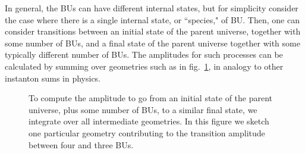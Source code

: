 \documentclass[11pt]{article}
\numberwithin{equation}{section}
\begin{document}
In general, the BUs can have different internal states, but for simplicity consider the case where there is a single internal state, or 
 ``species," of BU.  Then, one can consider transitions between an initial state of the parent universe, together with some number of BUs, and a final state of the parent universe together with some typically different number of BUs.  The amplitudes for such processes can be calculated by summing over geometries such as in fig.~\ref{fig:whamp}, in analogy to other instanton sums in physics.
\begin{figure}[h!]
\begin{center}
 \caption{\label{fig:whamp} To compute the amplitude to go from an initial state of the parent universe, plus some number of BUs, to a similar final state, we integrate over all intermediate geometries.  In this figure we sketch one particular geometry contributing to the transition amplitude between  four and three BUs.}
\end{center}
\end{figure}
\end{document}
